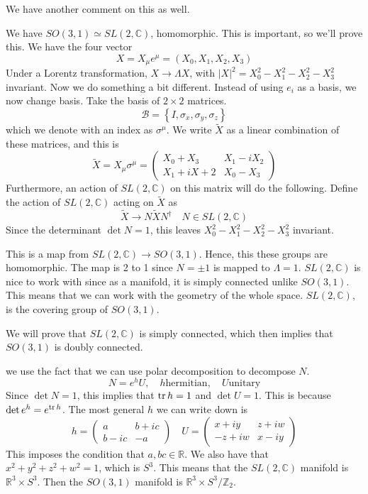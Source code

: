 \documentclass[11pt, oneside]{article}   	%
\theoremstyle{slanted}
\begin{document}
We have another comment on this as well. 

We have $ SO ( 3 , 1 ) \simeq SL \left( 2, \mathbb{ C }  \right)  $, 
homomorphic. This is important, so we'll prove this. 
We have the four vector 
\[
	X  = X _ \mu e ^{ \mu }  = \left( X _ 0 , X_1 , X_2, X_3  \right)  
\] Under a Lorentz transformation, 
$ X \to \Lambda X $, with $ | X | ^ 2  = X_0 ^ 2  - X_1 ^ 2  - X_2 ^ 2 - X_3 ^ 2 $
invariant. 
Now we do something a bit 
different. Instead of using $  e_ i$ 
as a basis, we now change basis. 
Take the basis of $ 2 \times 2 $ matrices. 
\[
	\mathcal{ B }  = \left\{  I, \sigma _ x , \sigma _ y , \sigma _ z  \right\} 
\] which we denote with an index as $ \sigma ^{ \mu } $. 
We write $ \tilde{ X }   $ as a linear 
combination of these matrices, and this is 
\[
 \tilde{ X }  = X _ \mu \sigma ^ \mu  = \begin{pmatrix}  
 X _ 0 + X _ 3 & X _1  - i X _ 2 \\ X_ 1 + i X+ 2 & X _ 0  - X_ 3 \end{pmatrix}   
\] Furthermore, an action 
of $ SL \left( 2, \mathbb{ C }  \right)  $ on this matrix 
will do the following.
Define the action of $ S L ( 2 , \mathbb{ C } ) $ acting on $ \tilde{ X }  $  as 
\[
	\tilde{ X } \to N \tilde{ X } N ^{ \dagger }   \quad N \in SL ( 2, \mathbb{ C } ) 
\] Since the determinant $ \det N  = 1 $, 
this leaves $ X_0 ^ 2 - X_1 ^ 2 - X_2 ^ 2  - X_3 ^ 2  $ invariant. 

This is a map from $ SL ( 2, \mathbb { C } ) \to SO (  3, 1 ) $. 
Hence, this these groups are homomorphic. 
The map is 2 to 1 since $ N  = \pm 1 $ is mapped to 
$ \Lambda  = 1 $. 
$ S L ( 2, \mathbb{ C } ) $ is nice 
to work with since as a manifold,
it is simply connected unlike $ SO ( 3 ,1 ) $. 
This means that we can work 
with the geometry of the whole space. 
$ SL ( 2, \mathbb{ C } ) $, is the 
covering group of $ SO ( 3, 1 ) $. 

We will prove that $ SL( 2, \mathbb{ C } ) $ is 
simply connected, which then implies that $ SO ( 3, 1 ) $ 
is doubly connected. 

we use the fact that 
we can use polar decomposition to 
decompose $ N $. 
\[
 N  = e ^{ h } U , \quad h \text{hermitian}, \quad U \text{unitary}
\] Since $ \det N  = 1 $, 
this implies that $\tr h  = 1 $ 
and $ \det U  = 1 $. 
This is because $ \det e ^{ h }  = e ^{\tr h } $. 
The most general $ h $ 
we can write down is 
\[
	h  = \begin{pmatrix}  
	a & b + i c \\ b  -i c &  - a  \end{pmatrix}  
	\quad U   = \begin{pmatrix}  x + i y & z +i w \\ 
	 - z + i w & x - i y \end{pmatrix} 
\] This imposes the condition 
that $ a, b c \in \mathbb{ R  } $. 
We also have that $ x ^2 + y ^2 + z ^ 2 + w ^ 2  = 1 $,
which is  $ S^ 3 $. 
This means that the $ SL ( 2, \mathbb{ C } ) $ 
manifold is $ \mathbb{ R } ^ 3 \times S ^ 3  $.
Then the $ SO ( 3, 1 ) $ manifold is $ \mathbb{ R } ^ 3 \times S ^ 3  / \mathbb{ Z } _ 2 $.
\end{document}

